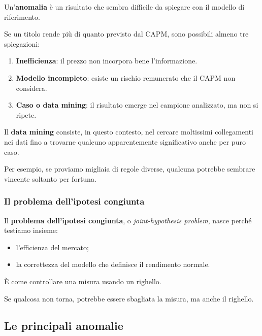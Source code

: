 \noindent Un'\textbf{anomalia}
è un risultato che sembra difficile
da spiegare con il modello di riferimento.

\noindent Se un titolo rende più
di quanto previsto dal CAPM,
sono possibili almeno tre spiegazioni:

\begin{enumerate}
    \item \textbf{Inefficienza}:
    il prezzo non incorpora bene l'informazione.

    \item \textbf{Modello incompleto}:
    esiste un rischio remunerato
    che il CAPM non considera.

    \item \textbf{Caso o data mining}:
    il risultato emerge nel campione analizzato,
    ma non si ripete.
\end{enumerate}

\medskip

\noindent Il \textbf{data mining}
consiste, in questo contesto,
nel cercare moltissimi collegamenti nei dati
fino a trovarne qualcuno apparentemente
significativo anche per puro caso.

\noindent Per esempio, se proviamo migliaia
di regole diverse, qualcuna potrebbe sembrare
vincente soltanto per fortuna.


\subsubsection*{Il problema dell'ipotesi congiunta}

\noindent Il \textbf{problema dell'ipotesi congiunta},
o \textit{joint-hypothesis problem},
nasce perché testiamo insieme:

\begin{itemize}
    \item l'efficienza del mercato;
    \item la correttezza del modello
    che definisce il rendimento normale.
\end{itemize}

\noindent È come controllare una misura
usando un righello.

\noindent Se qualcosa non torna,
potrebbe essere sbagliata la misura,
ma anche il righello.


\subsection{Le principali anomalie}

